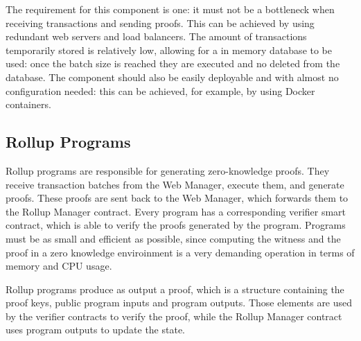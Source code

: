 The requirement for this component is one: it must not be a bottleneck when receiving transactions and sending proofs. This can be achieved by using redundant web servers and load balancers. The amount of transactions temporarily stored is relatively low, allowing for a in memory database to be used: once the batch size is reached  they are executed and no deleted from the database. The component should also be easily deployable and with almost no configuration needed: this can be achieved, for example, by using Docker containers.

\subsection{Rollup Programs\label{sec:designrollupprograms}}
Rollup programs are responsible for generating zero-knowledge proofs. They receive transaction batches from the Web Manager, execute them, and generate proofs. These proofs are sent back to the Web Manager, which forwards them to the Rollup Manager contract. Every program has a corresponding verifier smart contract, which is able to verify the proofs generated by the program. Programs must be as small and efficient as possible, since computing the witness and the proof in a zero knowledge enviroinment is a very demanding operation in terms of memory and CPU usage.

Rollup programs produce as output a proof, which is a structure containing the proof keys, public program inputs and program outputs. Those elements are used by the verifier contracts to verify the proof, while the Rollup Manager contract uses program outputs to update the state.
